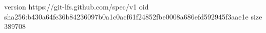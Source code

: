 version https://git-lfs.github.com/spec/v1
oid sha256:b430a64fe36b84236097b0a1c0acf61f24852fbe0008a686efd592945f3aae1e
size 389708
